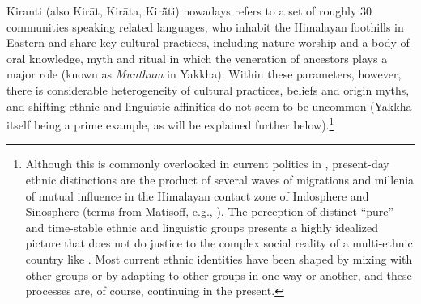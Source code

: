 Kiranti (also Kirāt, Kirāta, Kirā̃ti) nowadays refers to a set of roughly 30 communities speaking related languages, who inhabit the Himalayan foothills in Eastern  and share key cultural practices, including nature worship and a body of oral knowledge, myth and ritual in which the veneration of ancestors plays a major role (known as \emph{Munthum} in Yakkha). Within these parameters, however, there is considerable heterogeneity of cultural practices, beliefs and origin myths, and shifting ethnic and linguistic affinities do not seem to be uncommon (Yakkha itself being a prime example, as will be explained further below).\footnote{Although this is commonly overlooked in current politics in ,  present-day ethnic distinctions are the product of several waves of migrations and millenia of mutual influence in the Himalayan contact zone of Indosphere and Sinosphere (terms from Matisoff, e.g., \citealt{Matisoff1990_On}). The perception of distinct “pure” and time-stable ethnic and linguistic groups presents a highly idealized picture that does not do justice to the complex social reality of a multi-ethnic country like . Most current ethnic identities have been shaped by mixing with other groups or by adapting to other groups in one way or another, and these processes are, of course, continuing in the present.} 

